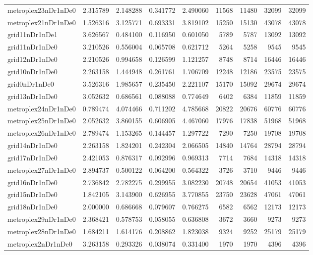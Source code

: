 \begin{longtable}{|l|r|r|r|r|r|r|r|r|}
metroplex23nDr1nDe0 & 2.315789 & 2.148288 & 0.341772 & 2.490060 & 11568 & 11480 & 32099 & 32099 \\
metroplex21nDr1nDe0 & 1.526316 & 3.125771 & 0.693331 & 3.819102 & 15250 & 15130 & 43078 & 43078 \\
grid11nDr1nDe1 & 3.626567 & 0.484100 & 0.116950 & 0.601050 & 5789 & 5787 & 13092 & 13092 \\
grid11nDr1nDe0 & 3.210526 & 0.556004 & 0.065708 & 0.621712 & 5264 & 5258 & 9545 & 9545 \\
grid12nDr1nDe0 & 2.210526 & 0.994658 & 0.126599 & 1.121257 & 8748 & 8714 & 16446 & 16446 \\
grid10nDr1nDe0 & 2.263158 & 1.444948 & 0.261761 & 1.706709 & 12248 & 12186 & 23575 & 23575 \\
grid0nDr1nDe0 & 3.526316 & 1.985657 & 0.235450 & 2.221107 & 15170 & 15092 & 29674 & 29674 \\
grid13nDr1nDe0 & 3.052632 & 0.686561 & 0.088088 & 0.774649 & 6402 & 6384 & 11859 & 11859 \\
metroplex24nDr1nDe0 & 0.789474 & 4.074466 & 0.711202 & 4.785668 & 20822 & 20676 & 60776 & 60776 \\
metroplex25nDr1nDe0 & 2.052632 & 3.860155 & 0.606905 & 4.467060 & 17976 & 17838 & 51968 & 51968 \\
metroplex26nDr1nDe0 & 2.789474 & 1.153265 & 0.144457 & 1.297722 & 7290 & 7250 & 19708 & 19708 \\
grid14nDr1nDe0 & 2.263158 & 1.824201 & 0.242304 & 2.066505 & 14840 & 14764 & 28794 & 28794 \\
grid17nDr1nDe0 & 2.421053 & 0.876317 & 0.092996 & 0.969313 & 7714 & 7684 & 14318 & 14318 \\
metroplex27nDr1nDe0 & 2.894737 & 0.500122 & 0.064200 & 0.564322 & 3726 & 3710 & 9446 & 9446 \\
grid16nDr1nDe0 & 2.736842 & 2.782275 & 0.299955 & 3.082230 & 20748 & 20654 & 41053 & 41053 \\
grid15nDr1nDe0 & 1.842105 & 3.143900 & 0.626955 & 3.770855 & 23750 & 23628 & 47061 & 47061 \\
grid18nDr1nDe0 & 2.000000 & 0.686668 & 0.079607 & 0.766275 & 6582 & 6562 & 12173 & 12173 \\
metroplex29nDr1nDe0 & 2.368421 & 0.578753 & 0.058055 & 0.636808 & 3672 & 3660 & 9273 & 9273 \\
metroplex28nDr1nDe0 & 1.684211 & 1.614176 & 0.208862 & 1.823038 & 9324 & 9252 & 25179 & 25179 \\
metroplex2nDr1nDe0 & 3.263158 & 0.293326 & 0.038074 & 0.331400 & 1970 & 1970 & 4396 & 4396 \\

\end{longtable}
